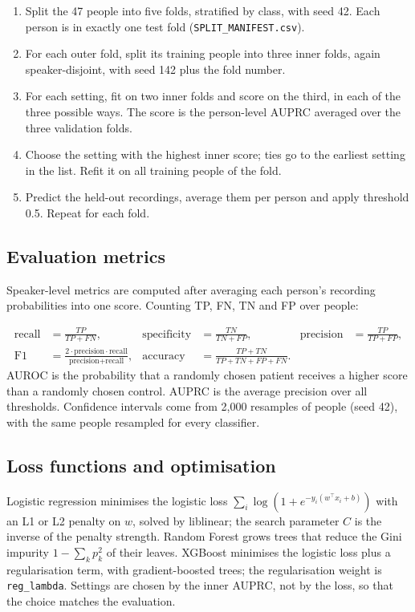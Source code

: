 \documentclass[11pt,a4paper]{article}
\begin{document}
\begin{enumerate}\item Split the 47 people into five folds, stratified by class, with seed 42. Each person is in exactly one test fold (\texttt{SPLIT\_\allowbreak{}MANIFEST.csv}).
\item For each outer fold, split its training people into three inner folds, again speaker-disjoint, with seed 142 plus the fold number.
\item For each setting, fit on two inner folds and score on the third, in each of the three possible ways. The score is the person-level AUPRC averaged over the three validation folds.
\item Choose the setting with the highest inner score; ties go to the earliest setting in the list. Refit it on all training people of the fold.
\item Predict the held-out recordings, average them per person and apply threshold 0.5. Repeat for each fold.
\end{enumerate}
\subsection{Evaluation metrics}\label{sec:metrics}
Speaker-level metrics are computed after averaging each person's recording probabilities into one score. Counting TP, FN, TN and FP over people:

\begin{align*} \text{recall} &= \frac{TP}{TP+FN}, & \text{specificity} &= \frac{TN}{TN+FP}, & \text{precision} &= \frac{TP}{TP+FP}, \\ \text{F1} &= \frac{2\cdot\text{precision}\cdot\text{recall}}{\text{precision}+\text{recall}}, & \text{accuracy} &= \frac{TP+TN}{TP+TN+FP+FN}. \end{align*}
AUROC is the probability that a randomly chosen patient receives a higher score than a randomly chosen control. AUPRC is the average precision over all thresholds. Confidence intervals come from 2,000 resamples of people (seed 42), with the same people resampled for every classifier.

\subsection{Loss functions and optimisation}\label{sec:loss}
Logistic regression minimises the logistic loss $\sum_i \log(1+e^{-y_i(w^\top x_i+b)})$ with an L1 or L2 penalty on $w$, solved by liblinear; the search parameter $C$ is the inverse of the penalty strength. Random Forest grows trees that reduce the Gini impurity $1-\sum_k p_k^2$ of their leaves. XGBoost minimises the logistic loss plus a regularisation term, with gradient-boosted trees; the regularisation weight is \texttt{reg\_\allowbreak{}lambda}. Settings are chosen by the inner AUPRC, not by the loss, so that the choice matches the evaluation.
\end{document}
